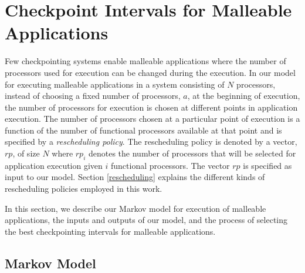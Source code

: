\documentclass[conference,10pt]{IEEEtran}
\begin{document}
\section{Checkpoint Intervals for Malleable Applications}
\label{malleable}

Few checkpointing systems enable malleable applications where the
number of processors used for execution can be changed during the
execution. In our model for executing malleable applications in a
system consisting of $N$ processors, instead of choosing a fixed number
of processors, $a$, at the beginning of execution, the number of
processors for execution is chosen at different points in application
execution. The number of processors chosen at a particular point of
execution is a function of the number of functional processors
available at that point and is specified by a {\em rescheduling
  policy}. The rescheduling policy is denoted by a vector, $rp$, of
size $N$ where $rp_i$ denotes the number of processors that will be
selected for application execution given $i$ functional
processors. The vector $rp$ is specified as input to our
model. Section \ref{rescheduling} explains the different kinds of rescheduling
policies employed in this work.

In this section, we describe our Markov model for execution of
malleable applications, the inputs and outputs of our model, and the
process of selecting the best checkpointing intervals for malleable
applications. 

\subsection{Markov Model}
\label{markovformalleable}
\end{document}
